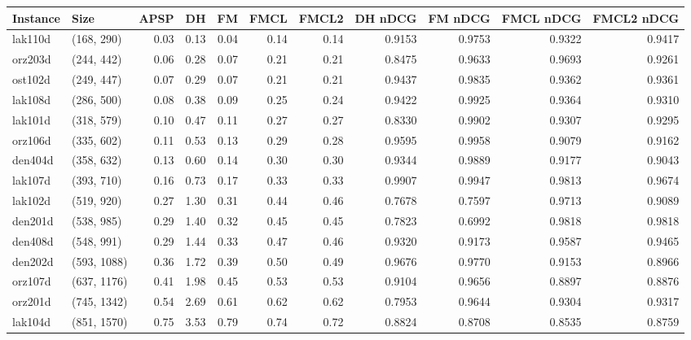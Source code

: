 \begin{tabular}{llrrrrrrrrr}
\toprule
Instance &         Size &  APSP &     DH &    FM &  FMCL &  FMCL2 &  DH nDCG &  FM nDCG &  FMCL nDCG &  FMCL2 nDCG \\
\midrule
 lak110d &   (168, 290) &  0.03 &   0.13 &  0.04 &  0.14 &   0.14 &   0.9153 &   0.9753 &     0.9322 &      0.9417 \\
 orz203d &   (244, 442) &  0.06 &   0.28 &  0.07 &  0.21 &   0.21 &   0.8475 &   0.9633 &     0.9693 &      0.9261 \\
 ost102d &   (249, 447) &  0.07 &   0.29 &  0.07 &  0.21 &   0.21 &   0.9437 &   0.9835 &     0.9362 &      0.9361 \\
 lak108d &   (286, 500) &  0.08 &   0.38 &  0.09 &  0.25 &   0.24 &   0.9422 &   0.9925 &     0.9364 &      0.9310 \\
 lak101d &   (318, 579) &  0.10 &   0.47 &  0.11 &  0.27 &   0.27 &   0.8330 &   0.9902 &     0.9307 &      0.9295 \\
 orz106d &   (335, 602) &  0.11 &   0.53 &  0.13 &  0.29 &   0.28 &   0.9595 &   0.9958 &     0.9079 &      0.9162 \\
 den404d &   (358, 632) &  0.13 &   0.60 &  0.14 &  0.30 &   0.30 &   0.9344 &   0.9889 &     0.9177 &      0.9043 \\
 lak107d &   (393, 710) &  0.16 &   0.73 &  0.17 &  0.33 &   0.33 &   0.9907 &   0.9947 &     0.9813 &      0.9674 \\
 lak102d &   (519, 920) &  0.27 &   1.30 &  0.31 &  0.44 &   0.46 &   0.7678 &   0.7597 &     0.9713 &      0.9089 \\
 den201d &   (538, 985) &  0.29 &   1.40 &  0.32 &  0.45 &   0.45 &   0.7823 &   0.6992 &     0.9818 &      0.9818 \\
 den408d &   (548, 991) &  0.29 &   1.44 &  0.33 &  0.47 &   0.46 &   0.9320 &   0.9173 &     0.9587 &      0.9465 \\
 den202d &  (593, 1088) &  0.36 &   1.72 &  0.39 &  0.50 &   0.49 &   0.9676 &   0.9770 &     0.9153 &      0.8966 \\
 orz107d &  (637, 1176) &  0.41 &   1.98 &  0.45 &  0.53 &   0.53 &   0.9104 &   0.9656 &     0.8897 &      0.8876 \\
 orz201d &  (745, 1342) &  0.54 &   2.69 &  0.61 &  0.62 &   0.62 &   0.7953 &   0.9644 &     0.9304 &      0.9317 \\
 lak104d &  (851, 1570) &  0.75 &   3.53 &  0.79 &  0.74 &   0.72 &   0.8824 &   0.8708 &     0.8535 &      0.8759 \\

\end{tabular}
